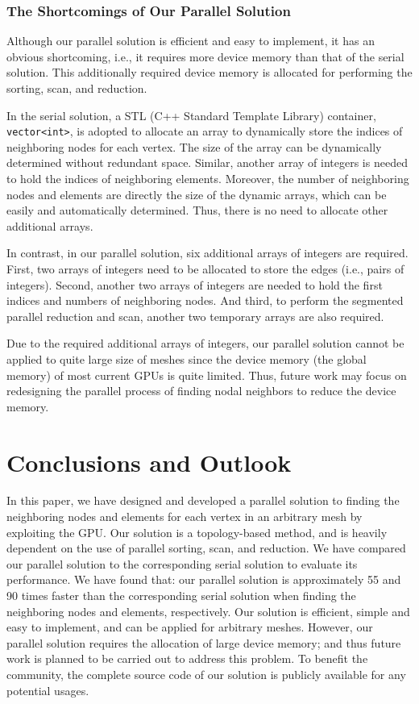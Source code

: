 \documentclass[twocolumn]{svjour3}          \smartqed  \usepackage{graphicx}
\begin{document}
\subsubsection{The Shortcomings of Our Parallel Solution}

Although our parallel solution is efficient and easy to implement, it has an 
obvious shortcoming, i.e., it requires more device memory than that 
of the serial solution. This additionally required device memory is 
allocated for performing the sorting, scan, and reduction. 

In the serial solution, a STL (C++ Standard Template Library) container, 
\texttt{vector<int>}, is adopted to allocate an array to dynamically store 
the indices of neighboring nodes for each vertex. The size of the array can 
be dynamically determined without redundant space. Similar, another array of 
integers is needed to hold the indices of neighboring elements. Moreover, 
the number of neighboring nodes and elements are directly the size of the 
dynamic arrays, which can be easily and automatically determined. Thus, 
there is no need to allocate other additional arrays. 

In contrast, in our parallel solution, six additional arrays of integers are 
required. First, two arrays of integers need to be allocated to store the 
edges (i.e., pairs of integers). Second, another two arrays of integers are 
needed to hold the first indices and numbers of neighboring nodes. And 
third, to perform the segmented parallel reduction and scan, another two 
temporary arrays are also required. 

Due to the required additional arrays of integers, our parallel solution 
cannot be applied to quite large size of meshes since the device memory (the 
global memory) of most current GPUs is quite limited. Thus, future work may 
focus on redesigning the parallel process of finding nodal neighbors to 
reduce the device memory. 

\section{Conclusions and Outlook}

In this paper, we have designed and developed a parallel solution to finding 
the neighboring nodes and elements for each vertex in an arbitrary mesh by 
exploiting the GPU. Our solution is a topology-based method, and is heavily 
dependent on the use of parallel sorting, scan, and reduction. We have 
compared our parallel solution to the corresponding serial solution to 
evaluate its performance. We have found that: our parallel solution is 
approximately 55 and 90 times faster than the corresponding serial solution 
when finding the neighboring nodes and elements, respectively. Our solution 
is efficient, simple and easy to implement, and can be applied for arbitrary 
meshes. However, our parallel solution requires the allocation of large 
device memory; and thus future work is planned to be carried out to address 
this problem. To benefit the community, the complete source code of our 
solution is publicly available for any potential usages. 
\end{document}
